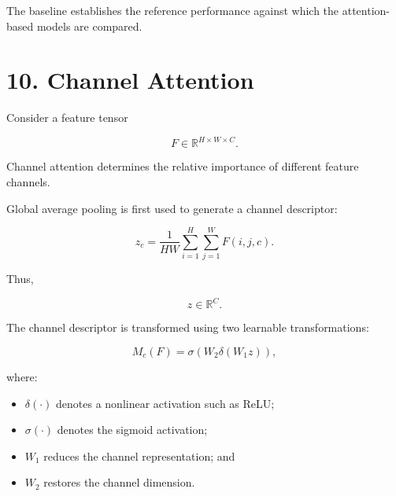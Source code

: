 \documentclass[10pt]{article}
\begin{document}
\begin{center}


\end{center}

The baseline establishes the reference performance against which the
attention-based models are compared.

\section*{10. Channel Attention}

Consider a feature tensor

\[
F\in\mathbb{R}^{H\times W\times C}.
\]

Channel attention determines the relative importance of different feature
channels.

Global average pooling is first used to generate a channel descriptor:

\[
z_c
=
\frac{1}{HW}
\sum_{i=1}^{H}
\sum_{j=1}^{W}
F(i,j,c).
\]

Thus,

\[
z\in\mathbb{R}^{C}.
\]

The channel descriptor is transformed using two learnable transformations:

\[
M_c(F)
=
\sigma
\left(
W_2
\delta
\left(
W_1z
\right)
\right),
\]

where:

\begin{itemize}

\item $\delta(\cdot)$ denotes a nonlinear activation such as ReLU;

\item $\sigma(\cdot)$ denotes the sigmoid activation;

\item $W_1$ reduces the channel representation; and

\item $W_2$ restores the channel dimension.

\end{itemize}
\end{document}
